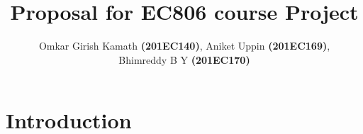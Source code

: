 \documentclass{article}
\author{Omkar Girish Kamath \textbf{(201EC140)}, Aniket Uppin \textbf{(201EC169)}, \\Bhimreddy B Y \textbf{(201EC170)}}
\date{}
\begin{document}
\title{Proposal for EC806 course Project}
\maketitle
\tableofcontents
\section{Introduction}
\end{document}
